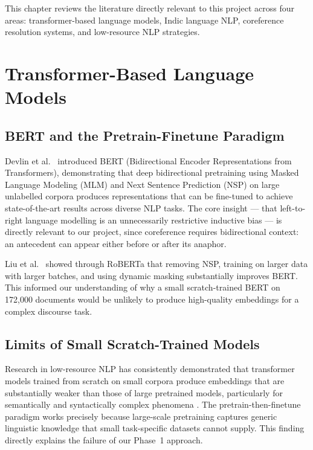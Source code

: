 \documentclass[12pt,a4paper]{report}
\begin{document}
This chapter reviews the literature directly relevant to this project across four areas: transformer-based language models, Indic language NLP, coreference resolution systems, and low-resource NLP strategies.

\section{Transformer-Based Language Models}

\subsection{BERT and the Pretrain-Finetune Paradigm}

Devlin et al.\ \cite{devlin2018bert} introduced BERT (Bidirectional Encoder Representations from Transformers), demonstrating that deep bidirectional pretraining using Masked Language Modeling (MLM) and Next Sentence Prediction (NSP) on large unlabelled corpora produces representations that can be fine-tuned to achieve state-of-the-art results across diverse NLP tasks. The core insight --- that left-to-right language modelling is an unnecessarily restrictive inductive bias --- is directly relevant to our project, since coreference requires bidirectional context: an antecedent can appear either before or after its anaphor.

Liu et al.\ \cite{liu2019roberta} showed through RoBERTa that removing NSP, training on larger data with larger batches, and using dynamic masking substantially improves BERT. This informed our understanding of why a small scratch-trained BERT on 172,000 documents would be unlikely to produce high-quality embeddings for a complex discourse task.

\subsection{Limits of Small Scratch-Trained Models}

Research in low-resource NLP has consistently demonstrated that transformer models trained from scratch on small corpora produce embeddings that are substantially weaker than those of large pretrained models, particularly for semantically and syntactically complex phenomena \cite{lauscher2020zero}. The pretrain-then-finetune paradigm works precisely because large-scale pretraining captures generic linguistic knowledge that small task-specific datasets cannot supply. This finding directly explains the failure of our Phase~1 approach.
\end{document}
